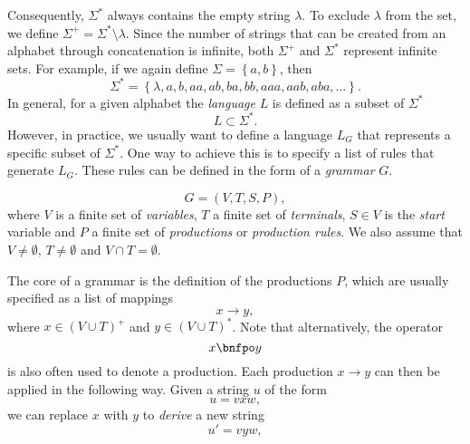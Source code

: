Consequently, $\Sigma^*$ always contains the empty string $\lambda$.
To exclude $\lambda$ from the set, we define $\Sigma^+ = \Sigma^* \setminus \lambda$.
Since the number of strings that can be created from an alphabet through concatenation is infinite, both $\Sigma^+$ and $\Sigma^*$ represent infinite sets.
For example, if we again define $\Sigma = \left\{a, b\right\}$, then
\begin{equation*}
	\Sigma^{*} = \left\{\lambda, a, b, aa, ab, ba, bb, aaa, aab, aba, \dots \right\}.
\end{equation*} 
In general, for a given alphabet the \emph{language} $L$ is defined as a subset of $\Sigma^*$
\begin{equation}
	L \subset \Sigma^*.
	\label{eq:language-basic-definition}
\end{equation}
However, in practice, we usually want to define a language $L_G$ that represents a specific subset of $\Sigma^*$.
One way to achieve this is to specify a list of rules that generate $L_G$.
These rules can be defined in the form of a \emph{grammar} $G$.
\begin{definition}[Grammar]
	\begin{equation}
		G = \left(V, T, S, P \right),
	\end{equation}
	where $V$ is a finite set of \emph{variables},
	$T$ a finite set of \emph{terminals},
	$S \in V$ is the \emph{start} variable and 
	$P$ a finite set of \emph{productions} or \emph{production rules}.
	We also assume that $V \neq \emptyset$, $T \neq \emptyset$ and $V \cap T = \emptyset$.
\end{definition}
The core of a grammar is the definition of the productions $P$, which are usually specified as a list of mappings
\begin{equation*}
	x \to y,
	\label{eq:unrestricted-production}
\end{equation*}
where $x \in \left(V \cup T\right)^+$ and $y \in \left(V \cup T\right)^*$.
Note that alternatively, the operator
\begin{equation*}
	x \bnfpo y
\end{equation*}
is also often used to denote a production.
Each production $x \to y$ can then be applied in the following way.
Given a string $u$ of the form 
\begin{equation*}
	u = vxw,
\end{equation*}
we can replace $x$ with $y$ to \emph{derive} a new string
\begin{equation}
	u' = vyw,
\end{equation}
